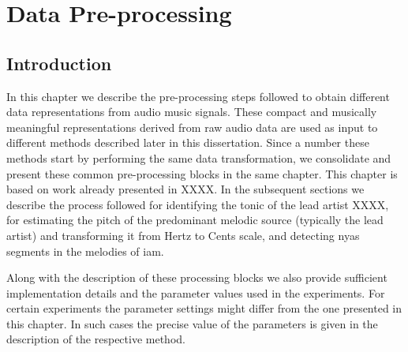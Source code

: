 
\chapter{Data Pre-processing}
\label{chap:data_preprocessing}


\section{Introduction}
\label{sec:data_preprocessing_intro}

In this chapter we describe the pre-processing steps followed to obtain different data representations from audio music signals. These compact and musically meaningful representations derived from raw audio data are used as input to different methods described later in this dissertation. Since a number these methods start by performing the same data transformation, we consolidate and present these common pre-processing blocks in the same chapter. This chapter is based on work already presented in XXXX. In the subsequent sections we describe the process followed for identifying the tonic of the lead artist XXXX, for estimating the pitch of the predominant melodic source (typically the lead artist) and transforming it from Hertz to Cents scale, and detecting \gls{nyas} segments in the melodies of \gls{iam}.

Along with the description of these processing blocks we also provide sufficient implementation details and the parameter values used in the experiments. For certain experiments the parameter settings might differ from the one presented in this chapter. In such cases the precise value of the parameters is given in the description of the respective method.


%


